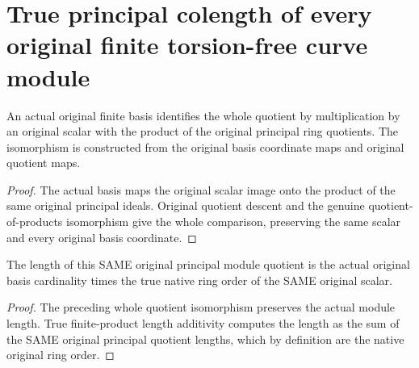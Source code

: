 \section{True principal colength of every original finite torsion-free curve module}

\begin{definition}
\label{def:fc-basis-principal-quotient}
\leanok
{}
An actual original finite basis identifies the whole quotient by
multiplication by an original scalar with the product of the
original principal ring quotients. The isomorphism is constructed
from the original basis coordinate maps and original quotient maps.
\end{definition}
\begin{proof}
The actual basis maps the original scalar image onto the product
of the same original principal ideals. Original quotient descent
and the genuine quotient-of-products isomorphism give the whole
comparison, preserving the same scalar and every original basis
coordinate.
\end{proof}

\begin{theorem}
\label{thm:fc-basis-principal-colength}
\leanok
{}
The length of this SAME original principal module quotient is the
actual original basis cardinality times the true native ring order
of the SAME original scalar.
\end{theorem}
\begin{proof}
The preceding whole quotient isomorphism preserves the actual
module length. True finite-product length additivity computes the
length as the sum of the SAME original principal quotient lengths,
which by definition are the native original ring order.
\end{proof}

